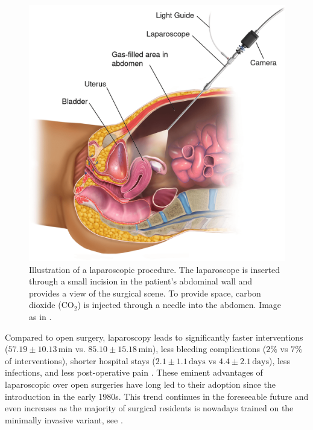 \begin{figure}
    \centering
    \includegraphics[width=\textwidth]{introduction/img/laparoscopy-min.png}
    \caption{Illustration of a laparoscopic procedure. The laparoscope is inserted through a small incision in the patient's abdominal wall and provides a view of the surgical scene. To provide space, carbon dioxide ($\text{CO}_2$) is injected through a needle into the abdomen. Image as in \cite{blausen2014laparoscopy}.}
    \label{in:fig:laparoscopy}
\end{figure}
Compared to open surgery, laparoscopy leads to significantly faster interventions ($57.19\pm10.13\,\text{min}$ vs. $85.10\pm15.18\,\text{min}$), less bleeding complications ($2\%$ vs $7\%$ of interventions), shorter hospital stays ($2.1\pm1.1\,\text{days}$ vs $4.4\pm2.1\,\text{days}$), less infections, and less post-operative pain \cite{shi2023laparoscopic}. These eminent advantages of laparoscopic over open surgeries have long led to their adoption since the introduction in the early 1980s. This trend continues in the foreseeable future and even increases as the majority of surgical residents is nowadays trained on the minimally invasive variant, see .

